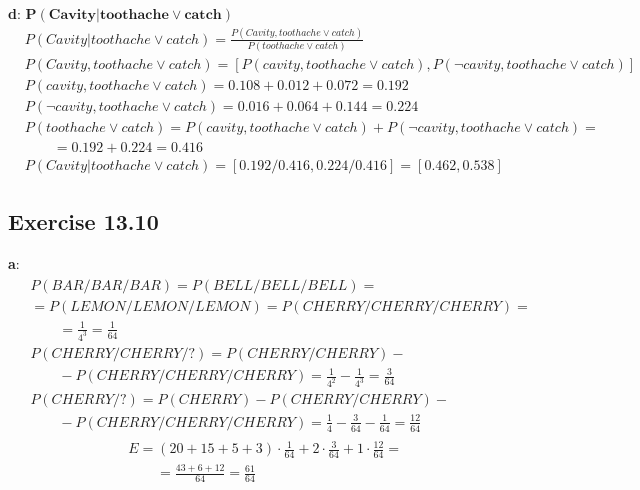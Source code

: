 \documentclass[12pt, a4paper]{article}
\begin{document}
            \textbf{d}: $\bm{P(Cavity|toothache \lor catch)}$
            \begin{align*}
                &P(Cavity|toothache \lor catch) = \frac{P(Cavity, toothache \lor catch)}{P(toothache \lor catch)} \\
                &P(Cavity, toothache \lor catch) = [P(cavity, toothache \lor catch), P(\neg cavity, toothache \lor catch)] \\
                &P(cavity, toothache \lor catch) = 0.108 + 0.012 + 0.072 = 0.192 \\
                &P(\neg cavity, toothache \lor catch) = 0.016 + 0.064 + 0.144 = 0.224 \\
                &P(toothache \lor catch) = P(cavity, toothache \lor catch) + P(\neg cavity, toothache \lor catch) =\\
                & \qquad = 0.192 + 0.224 = 0.416 \\
                &P(Cavity|toothache \lor catch) = [0.192 / 0.416, 0.224 / 0.416] = [0.462, 0.538]
            \end{align*}

        \subsection{Exercise 13.10}
            \textbf{a}:
            \begin{align}
            \label{a}
            \begin{split}
                &P(BAR/BAR/BAR) = P(BELL/BELL/BELL) =\\
                &= P(LEMON/LEMON/LEMON) = P(CHERRY/CHERRY/CHERRY) =\\
                & \qquad = \frac{1}{4^3} = \frac{1}{64}\\
                &P(CHERRY/CHERRY/?) = P(CHERRY/CHERRY) -\\
                & \qquad - P(CHERRY/CHERRY/CHERRY) = \frac{1}{4^2} - \frac{1}{4^3} = \frac{3}{64}\\
                &P(CHERRY/?) = P(CHERRY) - P(CHERRY/CHERRY) -\\
                & \qquad - P(CHERRY/CHERRY/CHERRY) = \frac{1}{4} - \frac{3}{64} - \frac{1}{64} = \frac{12}{64}
            \end{split}
            \end{align}
            \begin{align*}
                &E = (20 + 15 + 5 + 3) \cdot \frac{1}{64} + 2 \cdot \frac{3}{64} + 1 \cdot \frac{12}{64} =\\
                & \qquad = \frac{43 + 6 + 12}{64} = \frac{61}{64}
            \end{align*}
\end{document}
